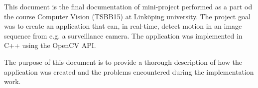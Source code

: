 This document is the final documentation of mini-project performed as a part od the course Computer Vision (TSBB15) at Linköping university. The project goal was to create an application that can, in real-time, detect motion in an image sequence from e.g. a surveillance camera. The application was implemented in C++ using the OpenCV API.

The purpose of this document is to provide a thorough description of how the application was created and the problems encountered during the implementation work.
